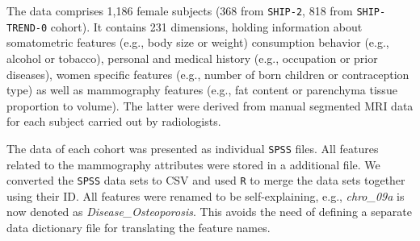 \documentclass[journal]{style/vgtc} 			          %
\newcommand{\com}[1]{\textcolor{orange}{\uline{#1}}}
\begin{document}
The data comprises 1,186 female subjects (368 from \texttt{SHIP-2}, 818 from \texttt{SHIP-TREND-0} cohort).
It contains 231 dimensions, holding information about somatometric features (e.g., body size or weight) consumption behavior (e.g., alcohol or tobacco), personal and medical history (e.g., occupation or prior diseases), women specific features (e.g., number of born children or contraception type) as well as mammography features (e.g., fat content or parenchyma tissue proportion to volume).
The latter were derived from manual segmented MRI data for each subject carried out by radiologists.

The data of each cohort was presented as individual \texttt{SPSS} files.
All features related to the mammography attributes were stored in a additional file.
We converted the \texttt{SPSS} data sets to CSV and used \texttt{R} to merge the data sets together using their ID.
All features were renamed to be self-explaining, e.g., \emph{chro\_09a} is now denoted as \emph{Disease\_Osteoporosis}.
This avoids the need of defining a separate data dictionary file for translating the feature names.
\end{document}
